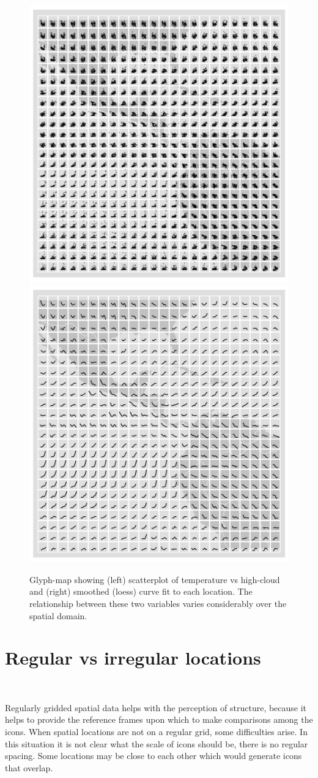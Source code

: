 \documentclass[oneside]{article}
\begin{document}
\begin{figure}[htbp]
  \centering
  \includegraphics[width=0.5\linewidth]{nasa-scat-glyph}%
  \includegraphics[width=0.5\linewidth]{nasa-loess-glyph}

  \caption{Glyph-map showing (left) scatterplot of temperature vs high-cloud and (right) smoothed (loess) curve fit to each location. The relationship between these two variables varies considerably over the spatial domain. }
  \label{fig:cloud}
\end{figure}

\section{Regular vs irregular locations}~\label{sec:irregular}

Regularly gridded spatial data helps with the perception of structure, because it helps to provide the reference frames upon which to make comparisons among the icons. When spatial locations are not on a regular grid, some difficulties arise. In this situation it is not clear what the scale of icons should be, there is no regular spacing. Some locations may be close to each other which would generate icons that overlap. 
\end{document}
